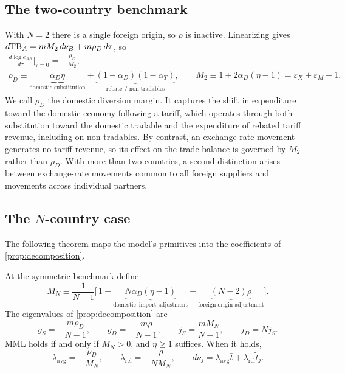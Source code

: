 \subsection{The two-country benchmark}
\label{sec:twocountry}

With $N=2$ there is a single foreign origin, so $\rho$ is inactive. Linearizing gives $d\mathrm{TB}_A=mM_2\,d\nu_B+m\rho_D\,d\tau$, so
\begin{equation}
\begin{gathered}
\frac{d\log e_{AB}}{d\tau}\bigg|_{\tau=0}=-\frac{\rho_D}{M_2},\\
\rho_D\equiv\underbrace{\alpha_D\eta}_{\text{domestic substitution}}+\underbrace{(1-\alpha_D)(1-\alpha_T)}_{\text{rebate / non-tradables}},\qquad
M_2\equiv1+2\alpha_D(\eta-1)=\varepsilon_X+\varepsilon_M-1.
\end{gathered}
\label{eq:twocountry}
\end{equation}
We call $\rho_D$ the domestic diversion margin. It captures the shift in expenditure toward the domestic economy following a tariff, which operates through both substitution toward the domestic tradable and the expenditure of rebated tariff revenue, including on non-tradables. By contrast, an exchange-rate movement generates no tariff revenue, so its effect on the trade balance is governed by $M_2$ rather than $\rho_D$. With more than two countries, a second distinction arises between exchange-rate movements common to all foreign suppliers and movements across individual partners.

\subsection{The \texorpdfstring{$N$}{N}-country case}
\label{sec:theorem}

The following theorem maps the model's primitives into the coefficients of \cref{prop:decomposition}.

\begin{theorem}
\label{thm:main}
At the symmetric benchmark define
\begin{equation}
M_N\equiv\frac{1}{N-1}\Big[\,1+\underbrace{N\alpha_D(\eta-1)}_{\text{domestic--import adjustment}}+\underbrace{(N-2)\rho}_{\text{foreign-origin adjustment}}\Big].
\label{eq:MN}
\end{equation}
The eigenvalues of \cref{prop:decomposition} are
\begin{equation}
g_S=-\frac{m\rho_D}{N-1},\qquad g_D=-\frac{m\rho}{N-1},\qquad j_S=\frac{mM_N}{N-1},\qquad j_D=Nj_S.
\label{eq:eigenvalues}
\end{equation}
MML holds if and only if $M_N>0$, and $\eta\geq1$ suffices. When it holds,
\begin{equation}
\lambda_{\mathrm{avg}}=-\frac{\rho_D}{M_N},\qquad \lambda_{\mathrm{rel}}=-\frac{\rho}{NM_N},\qquad d\nu_j=\lambda_{\mathrm{avg}}\bar t+\lambda_{\mathrm{rel}}\widetilde t_j.
\label{eq:lambdas}
\end{equation}
\end{theorem}

